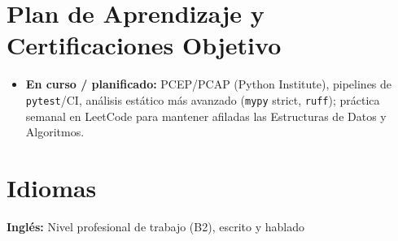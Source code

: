 \documentclass[10pt]{article}
\begin{document}
\section{Plan de Aprendizaje y Certificaciones Objetivo}
\begin{itemize}
  \item \textbf{En curso / planificado:} PCEP/PCAP (Python Institute), pipelines de \texttt{pytest}/CI, an\'alisis est\'atico m\'as avanzado (\texttt{mypy} strict, \texttt{ruff}); pr\'actica semanal en LeetCode para mantener afiladas las Estructuras de Datos y Algoritmos.
\end{itemize}

\section{Idiomas}
 \quad\textbullet\quad \textbf{Ingl\'es:} Nivel profesional de trabajo (B2), escrito y hablado
\end{document}
